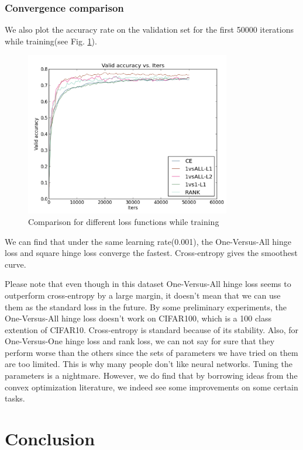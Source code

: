 \documentclass{article} %
\begin{document}
\subsubsection{Convergence comparison}
We also plot the accuracy rate on the validation set for the first 50000 iterations while training(see Fig. \ref{conv}).
\begin{figure}
\centering 
\includegraphics[width=0.8\textwidth]{plot_cnn.png}
\caption{Comparison for different loss functions while training}
\label{conv} 
\end{figure}
We can find that under the same learning rate(0.001), the One-Versus-All hinge loss and square hinge loss converge the fastest. Cross-entropy gives the smoothest curve.


Please note that even though in this dataset One-Versus-All hinge loss seems to outperform cross-entropy by a large margin, it doesn't mean that we can use them as the standard loss in the future. By some preliminary experiments, the One-Versus-All hinge loss doesn't work on CIFAR100, which is a 100 class extention of CIFAR10. Cross-entropy is standard because of its stability. Also, for One-Versus-One hinge loss and rank loss, we can not say for sure that they perform worse than
the others since the sets of parameters we have tried on them are too limited. This is why many people don't like neural networks. Tuning the parameters is a nightmare. However, we do find that by borrowing ideas from the convex optimization literature, we indeed see some improvements on some certain tasks. 



\section{Conclusion}



\end{document}
